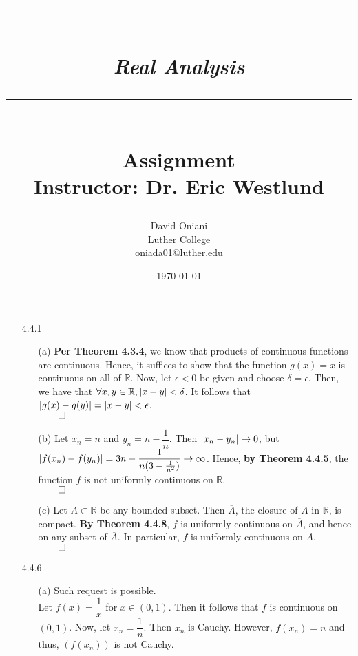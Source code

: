 \documentclass[11pt]{article}
\author{David Oniani\\
        Luther College\\
        \href{mailto:oniada01@luther.edu}{oniada01@luther.edu}}
\title{\rule{\paperwidth - 150pt}{1pt}\textbf{\\\textit{Real Analysis}\\}\rule
{\paperwidth - 150pt}{1pt}\\\textbf{Assignment \textnumero8}\\{\normalsize
Instructor: Dr. Eric Westlund}}
\date{\today}
\DeclarePairedDelimiter\abs{\lvert}{\rvert}%
\newcommand{\reals}{\mathbb{R}}
\begin{document}
\maketitle

%
%
%

\begin{itemize}
    \item[4.4.1]
        \begin{itemize}
            \item[(a)]
                \textbf{Per Theorem 4.3.4}, we know that products of continuous
                functions are continuous. Hence, it suffices to show that the
                function $g(x) = x$ is continuous on all of $\reals$. Now, let
                $\epsilon < 0$ be given and choose $\delta = \epsilon$.  Then,
                we have that $\forall x, y \in \reals, \abs{x - y} < \delta$.
                It follows that $\abs{g(x) - g(y)} = \abs{x - y} < \epsilon$.\\
                $\qed$

            \item[(b)]
                Let $x_n = n$ and $y_n = n - \dfrac{1}{n}$. Then $\abs{x_n -
                y_n} \to 0$, but $\abs{f(x_n) - f(y_n)} = 3n - \dfrac{1}{n(3 -
                \frac{1}{n^2})} \to \infty$. Hence, \textbf{by Theorem 4.4.5},
                the function $f$ is not uniformly continuous on $\reals$.\\
                $\qed$

            \item[(c)]
                Let $A \subset \reals$ be any bounded subset. Then
                $\overline{A}$, the closure of $A$ in $\reals$, is compact.
                \textbf{By Theorem 4.4.8}, $f$ is uniformly continuous on
                $\overline{A}$, and hence on any subset of $\overline{A}$. In
                particular, $f$ is uniformly continuous on $A$.\\
                $\qed$
        \end{itemize}

    \newpage

    \item[4.4.6]
        \begin{itemize}
            \item[(a)]
                Such request is possible.\\
                Let $f(x) = \dfrac{1}{x}$ for $x \in (0, 1)$. Then it follows
                that $f$ is continuous on $(0, 1)$. Now, let $x_n =
                \dfrac{1}{n}$.  Then $x_n$ is Cauchy. However, $f(x_n) = n$ and
                thus, $(f(x_n))$ is not Cauchy.


\end{itemize}
\end{itemize}
\end{document}
